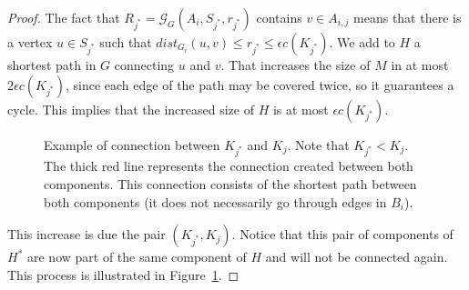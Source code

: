 \begin{proof}
The fact that \(R_{j^\ast} = \mathcal{G}_G(A_i, S_{j^\ast}, r_{j^\ast})\) contains \(v \in A_{i, j}\) means that there is a vertex \(u \in S_{j^\ast}\) such that \(dist_{G_i}(u, v) \leq r_{j^\ast} \leq \epsilon c(K_{j^\ast})\). We add to \(H\) a shortest path in \(G\) connecting \(u\) and \(v\). That increases the size of \(M\) in at most \(2 \epsilon c(K_{j^\ast})\), since each edge of the path may be covered twice, so it guarantees a cycle. This implies that the increased size of \(H\) is at most \(\epsilon c(K_{j^\ast})\).


\begin{figure}[H]
    \centering
{}
    \caption{Example of connection between \(K_{j^\ast}\) and \(K_j\). Note that \(K_{j^\ast} < K_j\). The thick red line represents the connection created between both components. This connection consists of the shortest path between both components (it does not necessarily go through edges in \(B_i\)).}
    \label{fig:connect_k_j_ast_and_k_j}
\end{figure}


This increase is due the pair \((K_{j^\ast}, K_j)\). Notice that this pair of components of \(H^\ast\) are now part of the same component of \(H\) and will not be connected again. This process is illustrated in Figure~\ref{fig:connect_k_j_ast_and_k_j}.


\end{proof}
